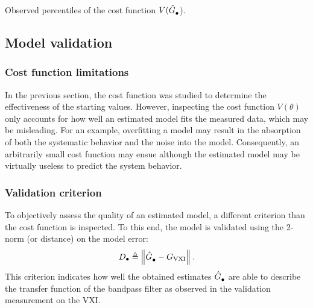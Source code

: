 \begin{table}[p]
  \centering
  \caption{Observed percentiles of the cost function $V(\hat{G}_{\mathrm{\bullet}}^{\mathrm{}}$).}
% 
  \label{tbl:costMeasurements}
\end{table}



\subsection{Model validation}
\subsubsection{Cost function limitations}
In the previous section, the cost function was studied to determine the effectiveness of the starting values.
However, inspecting the cost function $V(\theta)$ only accounts for how well an estimated model fits the measured data, which may be misleading.
For an example, overfitting a model may result in the absorption of both the systematic behavior and the noise into the model. 
Consequently, an arbitrarily small cost function may ensue although the estimated model may be virtually useless to predict the system behavior.

\subsubsection{Validation criterion}
To objectively assess the quality of an estimated model, a different criterion than the cost function is inspected.
To this end, the model is validated using the 2-norm (or distance) on the model error:
\begin{equation}
  D_{\bullet} 
  \triangleq 
  \left\| \hat{G}_{\mathrm{\bullet}}^{\mathrm{}} - G_{\mathrm{VXI}} \right\|_{}
  \text{.}
  \label{eq:measurementCriterion}
\end{equation} 
This criterion indicates how well the obtained estimates $\hat{G}_{\mathrm{\bullet}}^{\mathrm{}}$ are able to describe the transfer function of the bandpass filter as observed in the validation measurement on the \gls{VXI}.

